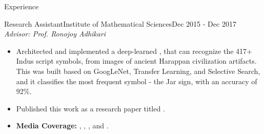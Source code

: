 \documentclass[]{mcdowellcv}
\begin{document}
\begin{cvsection}{Experience}
		\begin{cvsubsection}{Research Assistant}{Institute of Mathematical Sciences}{Dec 2015 - Dec 2017}
		    \textit{\href{https://github.com/tpsatish95/indus-script-ocr}{{\color{blue!70}{Optical Character Recognition on Indus Scripts}}}} \hfill \textit{Advisor: Prof. Ronojoy Adhikari}
			\begin{itemize}
				\item Architected and implemented a deep-learned \href{https://www.youtube.com/watch?v=qPF1oR9yMNY}{\color{blue!70}{Optical Character Recognition engine}}, that can recognize the 417+ Indus script symbols, from images of ancient Harappan civilization artifacts. This was built based on GoogLeNet, Transfer Learning, and Selective Search, and it classifies the most frequent symbol - the Jar sign, with an accuracy of 92\%.
				\item Published this work as a research paper titled \href{https://arxiv.org/pdf/1702.00523.pdf}{\color{blue!70}{"Deep Learning the Indus Script", arXiv:1702.00523v1}}.
				\item \textbf{Media Coverage:} \href{https://www.theverge.com/2017/1/25/14371450/indus-valley-civilization-ancient-seals-symbols-language-algorithms-ai\#EQQA6r}{{}}, \href{http://www.thehindu.com/sci-tech/science/chennai-team-taps-ai-to-read-indus-script/article17448690.ece}{{}}, \href{http://timesofindia.indiatimes.com/city/chennai/app-may-help-decipher-indus-valley-symbols/articleshow/57281369.cms}{{}}, and \href{http://www.sbs.com.au/yourlanguage/tamil/en/content/app-decipher-ancient-symbols?language=en}{{}}.
			\end{itemize}
		\end{cvsubsection}
		

\end{cvsection}
\end{document}

